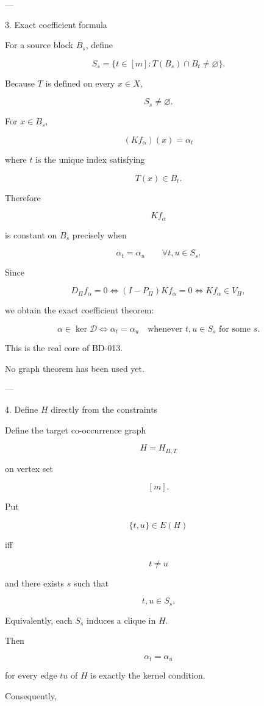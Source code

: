 ---

3. Exact coefficient formula

For a source block \(B_s\), define

\[
S_s
=
\{t\in[m]:
T(B_s)\cap B_t\neq\varnothing\}.
\]

Because \(T\) is defined on every \(x\in X\),

\[
S_s\neq\varnothing.
\]

For \(x\in B_s\),

\[
(Kf_\alpha)(x)
=
\alpha_{t}
\]

where \(t\) is the unique index satisfying

\[
T(x)\in B_t.
\]

Therefore

\[
Kf_\alpha
\]

is constant on \(B_s\) precisely when

\[
\alpha_t=\alpha_u
\qquad
\forall t,u\in S_s.
\]

Since

\[
D_\Pi f_\alpha=0
\iff
(I-P_\Pi)Kf_\alpha=0
\iff
Kf_\alpha\in V_\Pi,
\]

we obtain the exact coefficient theorem:

\[
\boxed{
\alpha\in\ker\mathcal D
\iff
\alpha_t=\alpha_u
\quad
\text{whenever }
t,u\in S_s
\text{ for some }s.
}
\]

This is the real core of BD-013.

No graph theorem has been used yet.


---

4. Define \(H\) directly from the constraints

Define the target co-occurrence graph

\[
H=H_{\Pi,T}
\]

on vertex set

\[
[m].
\]

Put

\[
\{t,u\}\in E(H)
\]

iff

\[
t\neq u
\]

and there exists \(s\) such that

\[
t,u\in S_s.
\]

Equivalently, each \(S_s\) induces a clique in \(H\).

Then

\[
\alpha_t=\alpha_u
\]

for every edge \(tu\) of \(H\) is exactly the kernel condition.

Consequently,

